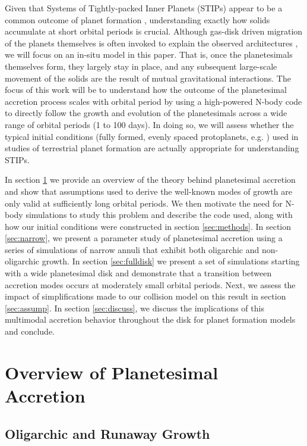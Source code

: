Given that Systems of Tightly-packed Inner Planets (STIPs) appear to
be a common outcome of planet formation \cite{lantham11, lissauer11, rowe14}, understanding exactly how
solids accumulate at short orbital periods is crucial. Although
gas-disk driven migration of the planets themselves is often invoked
to explain the observed architectures \cite{izidoro17, izidoro21}, we will focus on an in-situ
model in this paper. That is, once the planetesimals themselves form,
they largely stay in place, and any subsequent large-scale movement of
the solids are the result of mutual gravitational interactions. The
focus of this work will be to understand how the outcome of the
planetesimal accretion process scales with orbital period by using a
high-powered N-body code to directly follow the growth and evolution
of the planetesimals across a wide range of orbital periods (1 to 100
days). In doing so, we will assess whether the typical initial conditions (fully formed, evenly spaced protoplanets, e.g. \cite{raymond06}) used in studies of terrestrial planet formation are actually appropriate for understanding STIPs.

In section \ref{sec:theory} we provide an overview of the theory
behind planetesimal accretion and show that assumptions used to derive
the well-known modes of growth are only valid at sufficiently long
orbital periods. We then motivate the need for N-body simulations to
study this problem and describe the code used, along with how our
initial conditions were constructed in section \ref{sec:methods}. In
section \ref{sec:narrow}, we present a parameter study of planetesimal
accretion using a series of simulations of narrow annuli that exhibit both oligarchic and non-oligarchic growth. In section 
\ref{sec:fulldisk} we present a set of simulations starting with a  wide planetesimal disk and demonstrate that a transition 
between accretion modes occurs at moderately small orbital periods. Next, we assess the impact of 
simplifications made to our collision model on this result in section \ref{sec:assump}. In section \ref{sec:discuss}, we discuss the 
implications of this multimodal accretion behavior throughout the disk for planet formation models and conclude.

\section{Overview of Planetesimal Accretion}\label{sec:theory}

\subsection{Oligarchic and Runaway Growth}

